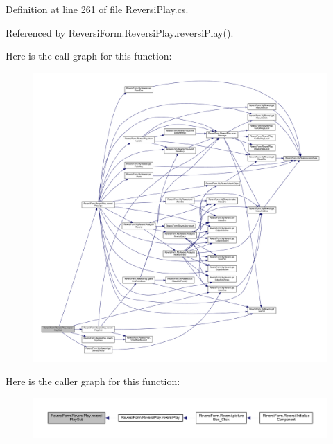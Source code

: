 Definition at line 261 of file Reversi\+Play.\+cs.



Referenced by Reversi\+Form.\+Reversi\+Play.\+reversi\+Play().

Here is the call graph for this function\+:
\nopagebreak
\begin{figure}[H]
\begin{center}
\leavevmode
\includegraphics[width=350pt]{class_reversi_form_1_1_reversi_play_a4fe42268a8d957c555db025f8b35d34e_cgraph}
\end{center}
\end{figure}
Here is the caller graph for this function\+:
\nopagebreak
\begin{figure}[H]
\begin{center}
\leavevmode
\includegraphics[width=350pt]{class_reversi_form_1_1_reversi_play_a4fe42268a8d957c555db025f8b35d34e_icgraph}
\end{center}
\end{figure}
\mbox{\label{class_reversi_form_1_1_reversi_play_a08062d3bd42d1780a6931b44a925503d}} 
